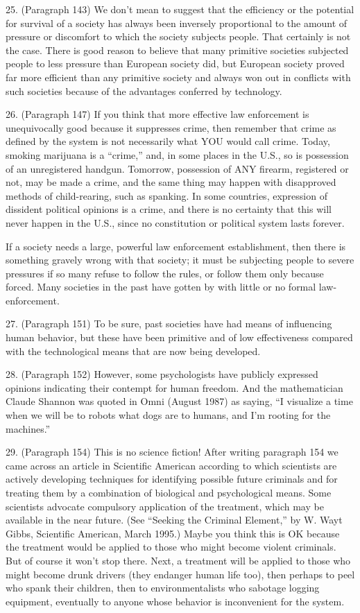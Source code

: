 25. (Paragraph 143) We don’t mean to suggest that the efficiency or the potential for survival of a society has always been inversely proportional to the amount of pressure or discomfort to which the society subjects people. That certainly is not the case. There is good reason to believe that many primitive societies subjected people to less pressure than European society did, but European society proved far more efficient than any primitive society and always won out in conflicts with such societies because of the advantages conferred by technology.

26. (Paragraph 147) If you think that more effective law enforcement is unequivocally good because it suppresses crime, then remember that crime as defined by the system is not necessarily what YOU would call crime. Today, smoking marijuana is a “crime,” and, in some places in the U.S., so is possession of an unregistered handgun. Tomorrow, possession of ANY firearm, registered or not, may be made a crime, and the same thing may happen with disapproved methods of child-rearing, such as spanking. In some countries, expression of dissident political opinions is a crime, and there is no certainty that this will never happen in the U.S., since no constitution or political system lasts forever.

If a society needs a large, powerful law enforcement establishment, then there is something gravely wrong with that society; it must be subjecting people to severe pressures if so many refuse to follow the rules, or follow them only because forced. Many societies in the past have gotten by with little or no formal law- enforcement.

27. (Paragraph 151) To be sure, past societies have had means of influencing human behavior, but these have been primitive and of low effectiveness compared with the technological means that are now being developed.

28. (Paragraph 152) However, some psychologists have publicly expressed opinions indicating their contempt for human freedom. And the mathematician Claude Shannon was quoted in Omni (August 1987) as saying, “I visualize a time when we will be to robots what dogs are to humans, and I’m rooting for the machines.”

29. (Paragraph 154) This is no science fiction! After writing paragraph 154 we came across an article in Scientific American according to which scientists are actively developing techniques for identifying possible future criminals and for treating them by a combination of biological and psychological means. Some scientists advocate compulsory application of the treatment, which may be available in the near future. (See “Seeking the Criminal Element,” by W. Wayt Gibbs, Scientific American, March 1995.) Maybe you think this is OK because the treatment would be applied to those who might become violent criminals. But of course it won’t stop there. Next, a treatment will be applied to those who might become drunk drivers (they endanger human life too), then perhaps to peel who spank their children, then to environmentalists who sabotage logging equipment, eventually to anyone whose behavior is inconvenient for the system.

